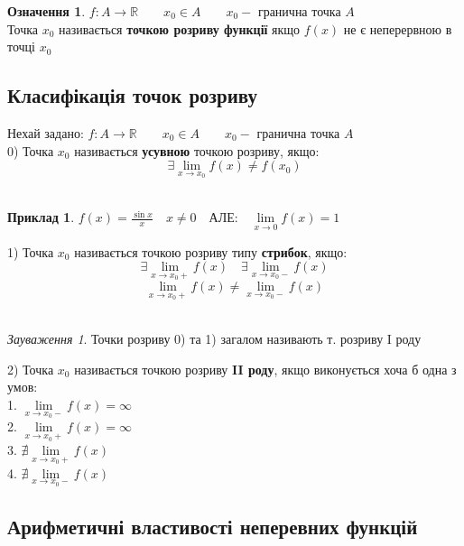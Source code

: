 \documentclass[14pt,a4paper]{scrartcl}
\theoremstyle{definition}
\newtheorem{defo}{Означення}[section]
\newtheorem*{example}{Приклад}
\theoremstyle{remark}
\newtheorem*{remark}{Зауваження}
\theoremstyle{definition}
\theoremstyle{definition}
\begin{document}
\begin{defo}
$f: A \to \mathbb{R} \qquad x_0 \in A \qquad x_0 -$ гранична точка $A$ \\
Точка $x_0$ називається \textbf{точкою розриву функції} якщо $f(x)$ не є неперервною в точці $x_0$\\
\end{defo}

\subsection{Класифікація точок розриву}

Нехай задано: $f: A \to \mathbb{R} \qquad x_0 \in A \qquad x_0 -$ гранична точка $A$\\

0) Точка $x_0$ називається \textbf{усувною} точкою розриву, якщо:\\
$$\exists  \lim\limits_{x\to x_0}{f(x)} \neq f(x_0) $$\\
\begin{example}
  $f(x) = \frac{\sin{x}}{x} \quad x\neq 0\quad $АЛЕ:$ \quad  \lim\limits_{x\to0}{f(x)} = 1$\\
\end{example}

1) Точка $x_0$ називається точкою розриву типу \textbf{стрибок}, якщо:
$$\exists  \lim\limits_{x\to x_0+}{f(x)} \quad
\exists  \lim\limits_{x\to x_0 -}{f(x)}$$
$$ \lim\limits_{x\to x_0+}{f(x)} \neq
\lim\limits_{x\to x_0 -}{f(x)} $$\\

\begin{remark}
  Точки розриву 0) та 1) загалом називають т. розриву I роду
\end{remark}

\pagebreak

2) Точка $x_0$ називається точкою розриву \textbf{II роду}, якщо виконується хоча б одна з умов:\\
1.  $\lim\limits_{x\to x_0 -}{f(x)} = \infty$\\
2.  $\lim\limits_{x\to x_0+}{f(x)} = \infty$\\
3.  $\nexists\lim\limits_{x\to x_0+}{f(x)} $\\
4.  $\nexists\lim\limits_{x\to x_0 -}{f(x)} $ \\

\subsection{Арифметичні властивості неперевних функцій}
\end{document}
